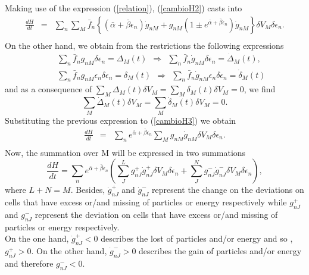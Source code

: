 \documentclass{article}
\begin{document}
Making use of the expression (\ref{relation}),
(\ref{cambioH2}) casts into
\begin{eqnarray}
    \frac{dH}{dt}&=&\sum_n \sum_M \bar{f}_n\left \{ (\bar{\alpha}+\bar{\beta}{\epsilon}_n)\dot{g}_{nM}+ g_{nM}\left(1\pm e^{\bar{\alpha}+\bar{\beta}{\epsilon}_n}\right)\dot{g}_{nM} \right \}\delta V_M \delta \epsilon_n. \nonumber \\
    \label{cambioH3}
\end{eqnarray}{}
On the other hand, we obtain from the restrictions the following expressions
\begin{eqnarray}
    &&\sum_n \bar{f}_n g_{nM} \delta \epsilon_n=\Delta_M(t) \ \  \Rightarrow \ \  \sum_n \bar{f}_n \dot{g}_{nM} \delta \epsilon_n=\dot{\Delta}_M(t), \nonumber \\
    &&\sum_n  \bar{f}_n g_{nM}\epsilon_n \delta \epsilon_n=\delta_M(t) \ \  \Rightarrow \ \  \sum_n \bar{f}_n \dot{g}_{nM}\epsilon_n \delta \epsilon_n=\dot{\delta}_M(t)
\end{eqnarray}{}
and as a consequence of $\sum_M \Delta_M(t) \delta V_M =\sum_M \delta_M(t)\delta V_M =0$, we find
\begin{equation}
    \sum_M \dot{\Delta}_M(t)\delta V_M =\sum_M \dot{\delta}_{M}(t)\delta V_M =0.
\end{equation}{}
Substituting the previous expression to (\ref{cambioH3}) we obtain
\begin{eqnarray}
   \frac{dH}{dt}&=&  \sum_n e^{\bar{\alpha}+\bar{\beta}\epsilon_n}\sum_M  g_{nM}\dot{g}_{nM}\delta V_M \delta \epsilon_n. \nonumber \\ \label{cambioH4}
\end{eqnarray}{}
Now, the summation over M will be expressed in two summations
\begin{equation}
    \frac{dH}{dt}=\sum_n  e^{\bar{\alpha}+\bar{\beta}\epsilon_n}\left(\sum_J ^{L} g^{+}_{nJ}\dot{g}^{+}_{nJ}\delta V_M \delta \epsilon_n+\sum^{N}_J  g^{-}_{nJ}\dot{g}^{-}_{nJ}\delta V_M \delta \epsilon_n \right), \label{cambioH5}
\end{equation}{}
where $L+N=M$. Besides, $\dot{g}^{+}_{nJ}$ and $\dot{g}^{-}_{nJ}$  represent the change on the deviations on cells that have excess or/and missing of particles or energy respectively while $g^{+}_{nJ}$ and $g^{-}_{nJ}$ represent the deviation on cells that have excess or/and missing of particles or energy respectively.\\
On the one hand, $\dot{g}^{+}_{nJ}<0$ describes the lost of particles and/or energy and so , $g^{+}_{nJ}>0$. On the other hand, $\dot{g}^{-}_{nJ}>0$ describes the gain of particles and/or energy and therefore $g^{-}_{nJ}<0$. \\
\end{document}
